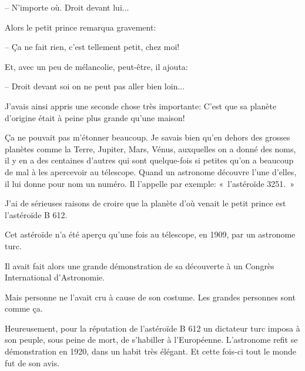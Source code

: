 \documentclass[a4paper]{report}
\begin{document}
-- N'importe où. Droit devant lui... 

Alors le petit prince remarqua gravement:

-- Ça ne fait rien, c'est tellement petit, chez moi! 

Et, avec un peu de mélancolie, peut-être, il ajouta: 

-- Droit devant soi on ne peut pas aller bien loin...

J'avais ainsi appris une seconde chose très importante: C'est que sa planète d'origine était à peine plus grande qu'une maison!

Ça ne pouvait pas m'étonner beaucoup. Je savais bien qu'en dehors des grosses planètes comme la Terre, Jupiter, Mars, Vénus, auxquelles on a donné des noms, il y en a des centaines d'autres qui sont quelque-fois si petites qu'on a beaucoup de mal à les apercevoir au télescope. Quand un astronome découvre l'une d'elles, il lui donne pour nom un numéro. Il l'appelle par exemple: «~l'astéroïde 3251.~»

J'ai de sérieuses raisons de croire que la planète d'où venait le petit prince est l'astéroïde B 612.

Cet astéroïde n'a été aperçu qu'une fois au télescope, en 1909, par un astronome turc.


Il avait fait alors une grande démonstration de sa découverte à un Congrès International d'Astronomie. 

Mais personne ne l'avait cru à cause de son costume. Les grandes personnes sont comme ça.


Heureusement, pour la réputation de l'astéroïde B 612 un dictateur turc imposa à son peuple, sous peine de mort, de s'habiller à l'Européenne. L'astronome refit se démonstration en 1920, dans un habit très élégant. Et cette fois-ci tout le monde fut de son avis.

\end{document}
